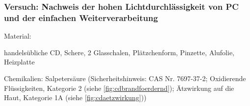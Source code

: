 \subsubsection{Versuch: Nachweis der hohen Lichtdurchlässigkeit von PC und der einfachen Weiterverarbeitung}

Material:
\begin{itemize*}
    \item handelsübliche CD, Schere, 2 Glasschalen, Plätzchenform, Pinzette, Alufolie, Heizplatte
    \item Chemikalien: Salpetersäure (Sicherheitshinweis: CAS Nr. 7697-37-2; Oxidierende Flüssigkeiten, Kategorie 2 (siehe \autoref{fig:cdbrandfoerdernd}); Ätzwirkung auf die Haut, Kategorie 1A (siehe \autoref{fig:cdaetzwirkung}))
\end{itemize*}


